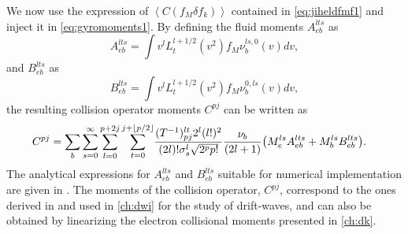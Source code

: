 We now use the expression of $\left< C(f_M \delta f_k)\right>$ contained in \cref{eq:jiheldfmf1} and inject it in \cref{eq:gyromoments1}.
%
By defining the fluid moments $A_{eb}^{lts}$ as
%
\begin{equation}
    A_{eb}^{lts} = \int v^l L_t^{l+1/2}(v^2) f_M \nu_{b}^{ls,0}(v)dv,
\end{equation}
%
and $B_{eb}^{lts}$ as
%
\begin{equation}
    B_{eb}^{lts} = \int v^l L_t^{l+1/2}(v^2) f_M \nu_{b}^{0,ls}(v)dv,
\end{equation}
%
the resulting collision operator moments $C^{pj}$ can be written as
%
\begin{align}
    C^{pj}=\sum_b\sum_{s=0}^{\infty}\sum_{l=0}^{p+2j}\sum_{t=0}^{j+\lfloor p/2\rfloor}&\frac{(T^{-1})^{lt}_{pj} 2^l (l!)^2}{(2l)!\sigma_s^l\sqrt{2^p p!}}\frac{\nu_{b}}{(2l+1)}
    {\left(M_e^{ls} A_{eb}^{lts}+M_b^{ls} B_{eb}^{lts}\right)}.
\label{eq:cabpj}
\end{align}
%
The analytical expressions for $A_{eb}^{lts}$ and $B_{eb}^{lts}$ suitable for numerical implementation are given in \citet{Ji2006}.
%
The moments of the collision operator, $C^{pj}$, correspond to the ones derived in \citet{Jorge2018} and used in \cref{ch:dwi} for the study of drift-waves, and can also be obtained by linearizing the electron collisional moments presented in \cref{ch:dk}.

